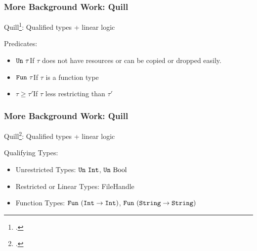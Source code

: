 \begin{frame}
  \frametitle{More Background Work: Quill}
  \begin{center}
    Quill\footcite{morris_best_2016}: {\color{blue}Qu}al{\color{blue}i}fied types + {\color{blue}l}inear {\color{blue}l}ogic\\
  \end{center}
  Predicates:
  \begin{itemize}
  \item $\texttt{Un}\ \tau$\quad If $\tau$ does not have resources
    or can be copied or dropped easily.
  \item $\texttt{Fun}\ \tau$\quad If $\tau$ is a function type
  \item $\tau \geq \tau'$\quad If $\tau$ less restricting than $\tau'$
  \end{itemize}
\end{frame}

\begin{frame}[fragile, c]
  \frametitle{More Background Work: Quill}
  \begin{center}
    Quill\footcite{morris_best_2016}: {\color{blue}Qu}al{\color{blue}i}fied types + {\color{blue}l}inear {\color{blue}l}ogic\\
  \end{center}
  Qualifying Types:
  \begin{itemize}
  \item Unrestricted Types: $\texttt{Un}\ \texttt{Int}$, $\texttt{Un}\ \text{Bool}$
  \item Restricted or Linear Types: FileHandle
  \item Function Types: $\texttt{Fun}\ (\texttt{Int} \rightarrow \texttt{Int})$,
    $\texttt{Fun}\ (\texttt{String} \rightarrow \texttt{String})$
  \end{itemize}
\end{frame}

